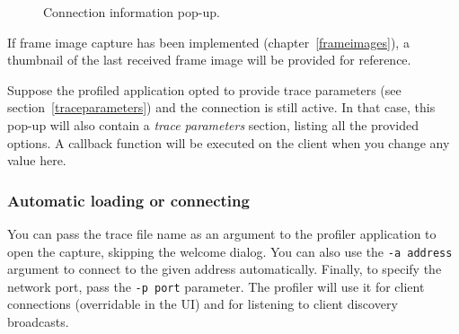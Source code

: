 \documentclass[hidelinks,titlepage,a4paper,twoside]{article}
\begin{document}
\begin{figure}[h]
\centering{}
\caption{Connection information pop-up.}
\label{connectioninfo}
\end{figure}

If frame image capture has been implemented (chapter~\ref{frameimages}), a thumbnail of the last received frame image will be provided for reference.

Suppose the profiled application opted to provide trace parameters (see section~\ref{traceparameters}) and the connection is still active. In that case, this pop-up will also contain a \emph{trace parameters} section, listing all the provided options. A callback function will be executed on the client when you change any value here.

\subsubsection{Automatic loading or connecting}

You can pass the trace file name as an argument to the profiler application to open the capture, skipping the welcome dialog. You can also use the \texttt{-a address} argument to connect to the given address automatically. Finally, to specify the network port, pass the \texttt{-p port} parameter. The profiler will use it for client connections (overridable in the UI) and for listening to client discovery broadcasts.
\end{document}
